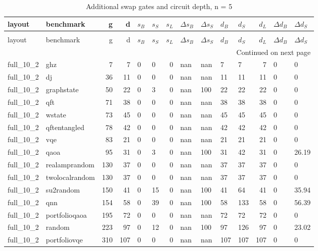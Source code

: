 \begin{longtable}{llrrllrllllrll}
\caption{Additional swap gates and circuit depth, n = 5} \label{benchmark-table-5} \\
\toprule
layout & benchmark & g & d & $s_B$ & $s_S$ & $s_L$ & $\Delta s_B$ & $\Delta s_S$ & $d_B$ & $d_S$ & $d_L$ & $\Delta d_B$ & $\Delta d_S$ \\
\midrule
\endfirsthead
\caption[]{Additional swap gates and circuit depth, n = 5} \\
\toprule
layout & benchmark & g & d & $s_B$ & $s_S$ & $s_L$ & $\Delta s_B$ & $\Delta s_S$ & $d_B$ & $d_S$ & $d_L$ & $\Delta d_B$ & $\Delta d_S$ \\
\midrule
\endhead
\midrule
\multicolumn{14}{r}{Continued on next page} \\
\midrule
\endfoot
\bottomrule
\endlastfoot
full\_10\_2 & ghz & 7 & 7 & 0 & 0 & 0 & nan & nan & 7 & 7 & 7 & 0 & 0 \\
full\_10\_2 & dj & 36 & 11 & 0 & 0 & 0 & nan & nan & 11 & 11 & 11 & 0 & 0 \\
full\_10\_2 & graphstate & 50 & 22 & 0 & 3 & 0 & nan & 100 & 22 & 22 & 22 & 0 & 0 \\
full\_10\_2 & qft & 71 & 38 & 0 & 0 & 0 & nan & nan & 38 & 38 & 38 & 0 & 0 \\
full\_10\_2 & wstate & 73 & 45 & 0 & 0 & 0 & nan & nan & 45 & 45 & 45 & 0 & 0 \\
full\_10\_2 & qftentangled & 78 & 42 & 0 & 0 & 0 & nan & nan & 42 & 42 & 42 & 0 & 0 \\
full\_10\_2 & vqe & 83 & 21 & 0 & 0 & 0 & nan & nan & 21 & 21 & 21 & 0 & 0 \\
full\_10\_2 & qaoa & 95 & 31 & 0 & 3 & 0 & nan & 100 & 31 & 42 & 31 & 0 & 26.19 \\
full\_10\_2 & realamprandom & 130 & 37 & 0 & 0 & 0 & nan & nan & 37 & 37 & 37 & 0 & 0 \\
full\_10\_2 & twolocalrandom & 130 & 37 & 0 & 0 & 0 & nan & nan & 37 & 37 & 37 & 0 & 0 \\
full\_10\_2 & su2random & 150 & 41 & 0 & 15 & 0 & nan & 100 & 41 & 64 & 41 & 0 & 35.94 \\
full\_10\_2 & qnn & 154 & 58 & 0 & 39 & 0 & nan & 100 & 58 & 133 & 58 & 0 & 56.39 \\
full\_10\_2 & portfolioqaoa & 195 & 72 & 0 & 0 & 0 & nan & nan & 72 & 72 & 72 & 0 & 0 \\
full\_10\_2 & random & 223 & 97 & 0 & 12 & 0 & nan & 100 & 97 & 126 & 97 & 0 & 23.02 \\
full\_10\_2 & portfoliovqe & 310 & 107 & 0 & 0 & 0 & nan & nan & 107 & 107 & 107 & 0 & 0 \\

\end{longtable}
